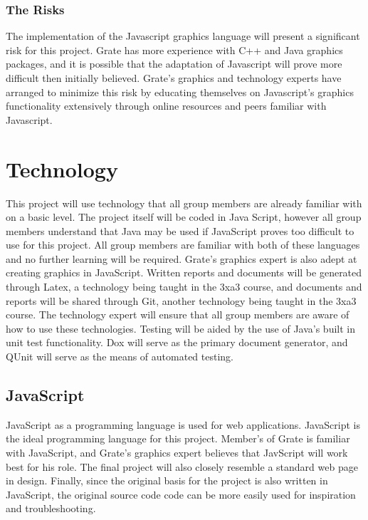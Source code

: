 \documentclass{article}
\begin{document}
\subsubsection{The Risks}
The implementation of the Javascript graphics language will present a 
significant risk for this project. Grate has more experience with C++ and Java 
graphics packages, and it is possible that the adaptation of Javascript will 
prove more difficult then initially believed. Grate's graphics and technology 
experts have arranged to minimize this risk by educating themselves on 
Javascript's graphics functionality extensively through online resources and 
peers familiar with Javascript.

\section{Technology}

This project will use technology that all group members are already familiar 
with on a basic level. The project itself will be coded in Java Script, however 
all group members understand that Java may be used if JavaScript proves too 
difficult to use for this project. All group members are familiar with both of 
these languages and no further learning will be required. Grate's graphics 
expert is also adept at creating graphics in JavaScript. Written reports and 
documents will be generated through Latex, a technology being taught in the 3xa3 
course, and documents and reports will be shared through Git, another technology 
being taught in the 3xa3 course. The technology expert will ensure that all 
group members are aware of how to use these technologies. Testing will be aided 
by the use of Java’s built in unit test functionality. Dox will serve as the 
primary document generator, and QUnit will serve as the means of automated 
testing.

\subsection{JavaScript}

JavaScript as a programming language is used for web applications. JavaScript is 
the ideal programming language for this project. Member's of Grate is familiar 
with JavaScript, and Grate's graphics 
expert believes that JavScript will work best for his role. The final project 
will also closely 
resemble a standard web page in design. Finally, since the original basis for 
the 
project is also written in JavaScript, the original source code code can be more 
easily used for 
inspiration and troubleshooting.
\end{document}
